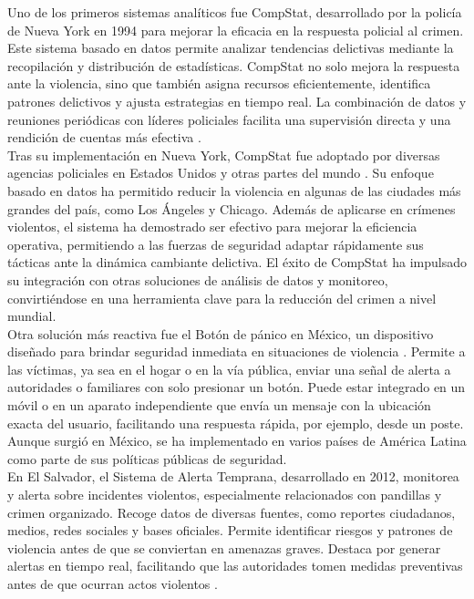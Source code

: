 Uno de los primeros sistemas analíticos fue CompStat, 
desarrollado por la policía de Nueva York en 1994 para mejorar 
la eficacia en la respuesta policial al crimen. Este sistema 
basado en datos permite analizar tendencias delictivas mediante 
la recopilación y distribución de estadísticas. CompStat no 
solo mejora la respuesta ante la violencia, sino que también 
asigna recursos eficientemente, identifica patrones delictivos y 
ajusta estrategias en tiempo real. La combinación de datos 
y reuniones periódicas con líderes policiales facilita una 
supervisión directa y una rendición de cuentas más efectiva 
\cite{perf2003compstat}.\\

Tras su implementación en Nueva York, CompStat fue adoptado 
por diversas agencias policiales en Estados Unidos y otras 
partes del mundo \cite{weisburd2003reforming}. Su enfoque 
basado en datos ha permitido reducir la violencia en algunas 
de las ciudades más grandes del país, como Los Ángeles y 
Chicago. Además de aplicarse en crímenes violentos, el 
sistema ha demostrado ser efectivo para mejorar la eficiencia 
operativa, permitiendo a las fuerzas de seguridad adaptar 
rápidamente sus tácticas ante la dinámica cambiante delictiva. 
El éxito de CompStat ha impulsado su integración con otras 
soluciones de análisis de datos y monitoreo, convirtiéndose 
en una herramienta clave para la reducción del crimen a nivel 
mundial.\\

Otra solución más reactiva fue el Botón de pánico en México, 
un dispositivo diseñado para brindar seguridad inmediata en 
situaciones de violencia \cite{cdmx2008botonpanico}. Permite 
a las víctimas, ya sea en el hogar o en la vía pública, 
enviar una señal de alerta a autoridades o familiares con 
solo presionar un botón. Puede estar integrado en un móvil 
o en un aparato independiente que envía un mensaje con la 
ubicación exacta del usuario, facilitando una respuesta rápida, 
por ejemplo, desde un poste. Aunque surgió en México, se 
ha implementado en varios países de América Latina como parte 
de sus políticas públicas de seguridad.\\

En El Salvador, el Sistema de Alerta Temprana, desarrollado 
en 2012, monitorea y alerta sobre incidentes violentos, 
especialmente relacionados con pandillas y crimen organizado. 
Recoge datos de diversas fuentes, como reportes ciudadanos, 
medios, redes sociales y bases oficiales. Permite 
identificar riesgos y patrones de violencia antes de que se 
conviertan en amenazas graves. Destaca por generar alertas 
en tiempo real, facilitando que las autoridades tomen medidas 
preventivas antes de que ocurran actos violentos 
\cite{MinisteriodeJusticiaySeguridadPblica2025}.\\

